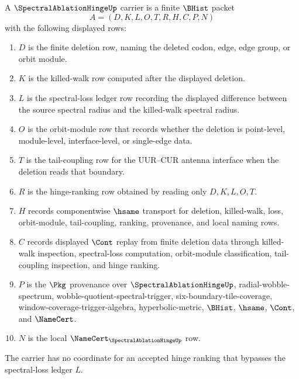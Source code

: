 \begin{definition}
\label{def:spectral-ablation-hinge-carrier}
A $\SpectralAblationHingeUp$ carrier is a finite $\BHist$ packet
$$
A=(D,K,L,O,T,R,H,C,P,N)
$$
with the following displayed rows:
\begin{enumerate}
\item $D$ is the finite deletion row, naming the deleted codon, edge, edge group, or orbit module.
\item $K$ is the killed-walk row computed after the displayed deletion.
\item $L$ is the spectral-loss ledger row recording the displayed difference between the source spectral radius and the killed-walk spectral radius.
\item $O$ is the orbit-module row that records whether the deletion is point-level, module-level, interface-level, or single-edge data.
\item $T$ is the tail-coupling row for the $\mathrm{UUR}$--$\mathrm{CUR}$ antenna interface when the deletion reads that boundary.
\item $R$ is the hinge-ranking row obtained by reading only $D,K,L,O,T$.
\item $H$ records componentwise $\hsame$ transport for deletion, killed-walk, loss, orbit-module, tail-coupling, ranking, provenance, and local naming rows.
\item $C$ records displayed $\Cont$ replay from finite deletion data through killed-walk inspection, spectral-loss computation, orbit-module classification, tail-coupling inspection, and hinge ranking.
\item $P$ is the $\Pkg$ provenance over $\SpectralAblationHingeUp$, radial-wobble-spectrum, wobble-quotient-spectral-trigger, six-boundary-tile-coverage, window-coverage-trigger-algebra, hyperbolic-metric, $\BHist$, $\hsame$, $\Cont$, and $\NameCert$.
\item $N$ is the local $\NameCert_{\SpectralAblationHingeUp}$ row.
\end{enumerate}
The carrier has no coordinate for an accepted hinge ranking that bypasses the spectral-loss ledger $L$.
\end{definition}


